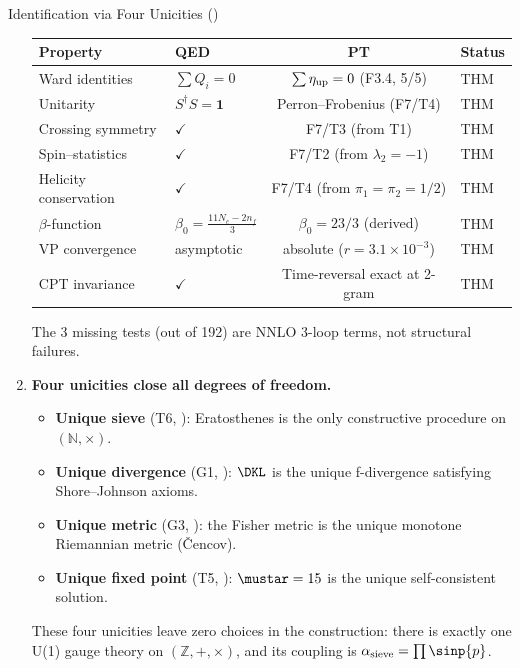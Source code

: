 \documentclass[12pt,a4paper]{article}
\begin{document}
\begin{thmbox}{Identification via Four Unicities (\BRIDGETAG)}
\begin{enumerate}[leftmargin=*, label=\textbf{(\roman*)}]
  \begin{center}
  \begin{tabular}{llcl}
  \toprule
  \textbf{Property} & \textbf{QED} & \textbf{PT} & \textbf{Status} \\
  \midrule
  Ward identities & $\sum Q_i = 0$ & $\sum \eta_{\rm up} = 0$ (F3.4, 5/5) & THM \\
  Unitarity & $S^\dagger S = \mathbf{1}$ & Perron--Frobenius (F7/T4) & THM \\
  Crossing symmetry & $\checkmark$ & F7/T3 (from T1) & THM \\
  Spin--statistics & $\checkmark$ & F7/T2 (from $\lambda_2 = -1$) & THM \\
  Helicity conservation & $\checkmark$ & F7/T4 (from $\pi_1=\pi_2=1/2$) & THM \\
  $\beta$-function & $\beta_0 = \frac{11N_c-2n_f}{3}$ & $\beta_0 = 23/3$ (derived) & THM \\
  VP convergence & asymptotic & absolute ($r = 3.1\!\times\!10^{-3}$) & THM \\
  CPT invariance & $\checkmark$ & Time-reversal exact at 2-gram & THM \\
  \bottomrule
  \end{tabular}
  \end{center}
  The 3 missing tests (out of 192) are NNLO 3-loop
  terms, not structural failures.

\item \textbf{Four unicities close all degrees of freedom.}
  \begin{itemize}[nosep]
  \item \textbf{Unique sieve} (T6, \cite{companion_M2}): Eratosthenes is the only
    constructive procedure on $(\mathbb{N}, \times)$.
  \item \textbf{Unique divergence} (G1, \cite{companion_M2}): $\DKL$ is the unique
    f-divergence satisfying Shore--Johnson axioms.
  \item \textbf{Unique metric} (G3, \cite{companion_M2}): the Fisher metric is the
    unique monotone Riemannian metric (\v{C}encov).
  \item \textbf{Unique fixed point} (T5, \cite{companion_M3}): $\mustar = 15$ is the
    unique self-consistent solution.
  \end{itemize}
  These four unicities leave zero choices in the construction: there is
  exactly one U(1) gauge theory on $(\mathbb{Z}, +, \times)$, and its
  coupling is $\alpha_{\rm sieve} = \prod \sinp{p}$.


\end{enumerate}
\end{thmbox}
\end{document}
